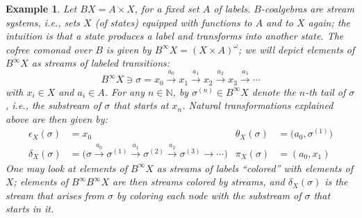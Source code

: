 \documentclass[adraft,copyright,creativecommons]{eptcs}
\newtheorem{example}[theorem]{Example}
\newcommand{\Bb}{B^{\infty}}
\newcommand{\goes}[1]{\stackrel{#1}{\longrightarrow}}
\begin{document}
\begin{example}\label{ex:stream-coalg}\rm
Let $BX = A\times X$, for a fixed set $A$ of {\em labels}. $B$-coalgebras are {\em stream systems}, i.e., sets $X$ (of {\em states}) equipped with functions to $A$ and to $X$ again; the intuition is that a state produces a label and transforms into another state. The cofree comonad over $B$ is given by $\Bb X = (X\times A)^{\omega}$; we will depict elements of $\Bb X$ as streams of labeled transitions:
\[
	\Bb X\ni \sigma = x_0 \goes{a_0} x_1 \goes{a_1} x_2 \goes{a_2} x_3 \goes{a_3} \cdots
\]
with $x_i\in X$ and $a_i\in A$. For any $n\in\mathbb{N}$, by $\sigma^{(n)}\in\Bb X$ denote the $n$-th tail of $\sigma$, i.e., the substream of $\sigma$ that starts at $x_n$. Natural transformations explained above are then given by:
\begin{align*}
	\epsilon_X(\sigma) &= x_0 & \theta_X(\sigma) &= \big( a_0, \sigma^{(1)} ) \\
	\delta_X(\sigma) &= \big( \sigma \goes{a_0} \sigma^{(1)} \goes{a_1} \sigma^{(2)} \goes{a_2} \sigma^{(3)} \goes{} \cdots ) & 
	\pi_X(\sigma) &= (a_0,x_1)
\end{align*}
One may look at elements of $\Bb X$ as streams of labels ``colored'' with elements of $X$; elements of $\Bb\Bb X$ are then streams colored by streams, and $\delta_X(\sigma)$ is the stream that arises from $\sigma$ by coloring each node with the substream of $\sigma$ that starts in it.
\end{example}
\end{document}
